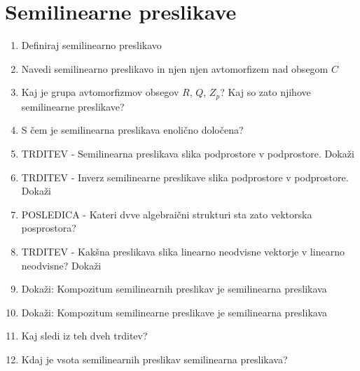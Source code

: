 \documentclass{article}
\begin{document}
    \section{Semilinearne preslikave}
    \begin{enumerate}
        \item Definiraj semilinearno preslikavo
        \item Navedi semilinearno preslikavo in njen njen avtomorfizem nad obsegom $C$
        \item Kaj je grupa avtomorfizmov obsegov $R$, $Q$, $Z_p$? Kaj so zato njihove semilinearne preslikave?
        \item S čem je semilinearna preslikava enolično določena?
        \item TRDITEV - Semilinearna preslikava slika podprostore v podprostore. Dokaži
        \item TRDITEV - Inverz semilinearne preslikave slika podprostore v podprostore. Dokaži
        \item POSLEDICA - Kateri dvve algebraični strukturi sta zato vektorska posprostora?
        \item TRDITEV - Kakšna preslikava slika linearno neodvisne vektorje v linearno neodvisne? Dokaži
        \item Dokaži: Kompozitum semilinearnih preslikav je semilinearna preslikava
        \item Dokaži: Kompozitum semilinearne preslikave je semilinearna preslikava
        \item Kaj sledi iz teh dveh trditev?
        \item Kdaj je vsota semilinearnih preslikav semilinearna preslikava?
    \end{enumerate}
\end{document}
